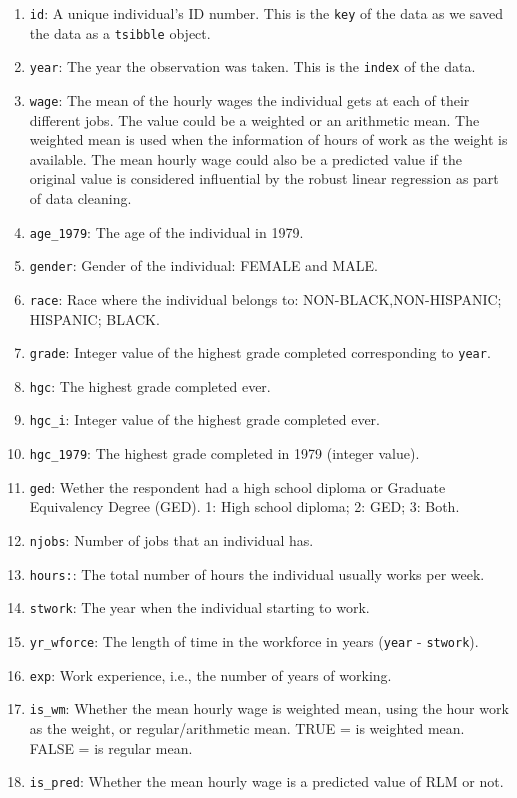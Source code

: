 \documentclass{article}
\begin{document}
\begin{enumerate}
\def\labelenumi{\arabic{enumi}.}
\item
  \texttt{id}: A unique individual's ID number. This is the \texttt{key} of the data as we saved the data as a \texttt{tsibble} object.
\item
  \texttt{year}: The year the observation was taken. This is the \texttt{index} of the data.
\item
  \texttt{wage}: The mean of the hourly wages the individual gets at each of their different jobs. The value could be a weighted or an arithmetic mean. The weighted mean is used when the information of hours of work as the weight is available. The mean hourly wage could also be a predicted value if the original value is considered influential by the robust linear regression as part of data cleaning.
\item
  \texttt{age\_1979}: The age of the individual in 1979.
\item
  \texttt{gender}: Gender of the individual: FEMALE and MALE.
\item
  \texttt{race}: Race where the individual belongs to: NON-BLACK,NON-HISPANIC; HISPANIC; BLACK.
\item
  \texttt{grade}: Integer value of the highest grade completed corresponding to \texttt{year}.
\item
  \texttt{hgc}: The highest grade completed ever.
\item
  \texttt{hgc\_i}: Integer value of the highest grade completed ever.
\item
  \texttt{hgc\_1979}: The highest grade completed in 1979 (integer value).
\item
  \texttt{ged}: Wether the respondent had a high school diploma or Graduate Equivalency Degree (GED). 1: High school diploma; 2: GED; 3: Both.
\item
  \texttt{njobs}: Number of jobs that an individual has.
\item
  \texttt{hours:}: The total number of hours the individual usually works per week.
\item
  \texttt{stwork}: The year when the individual starting to work.
\item
  \texttt{yr\_wforce}: The length of time in the workforce in years (\texttt{year} - \texttt{stwork}).
\item
  \texttt{exp}: Work experience, i.e., the number of years of working.
\item
  \texttt{is\_wm}: Whether the mean hourly wage is weighted mean, using the hour work as the weight, or regular/arithmetic mean. TRUE = is weighted mean. FALSE = is regular mean.
\item
  \texttt{is\_pred}: Whether the mean hourly wage is a predicted value of RLM or not.
\end{enumerate}
\end{document}

